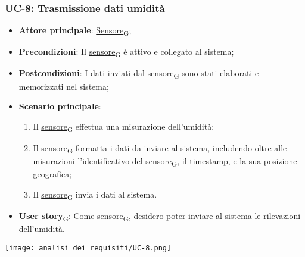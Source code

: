 \subsubsection{UC-8: Trasmissione dati umidità}
\begin{itemize}
	\item \textbf{Attore principale}: \href{https://7last.github.io/docs/rtb/documentazione-interna/glossario\#sensore}{Sensore\textsubscript{G}};
	\item \textbf{Precondizioni}: Il \href{https://7last.github.io/docs/rtb/documentazione-interna/glossario\#sensore}{sensore\textsubscript{G}} è attivo e collegato al sistema;
	\item \textbf{Postcondizioni}: I dati inviati dal \href{https://7last.github.io/docs/rtb/documentazione-interna/glossario\#sensore}{sensore\textsubscript{G}} sono stati elaborati e memorizzati nel sistema;
	\item \textbf{Scenario principale}:
	      \begin{enumerate}
		      \item Il \href{https://7last.github.io/docs/rtb/documentazione-interna/glossario\#sensore}{sensore\textsubscript{G}} effettua una misurazione dell'umidità;
		      \item Il \href{https://7last.github.io/docs/rtb/documentazione-interna/glossario\#sensore}{sensore\textsubscript{G}} formatta i dati da inviare al sistema, includendo oltre alle misurazioni l'identificativo del \href{https://7last.github.io/docs/rtb/documentazione-interna/glossario\#sensore}{sensore\textsubscript{G}},
		            il timestamp, e la sua posizione geografica;
		      \item Il \href{https://7last.github.io/docs/rtb/documentazione-interna/glossario\#sensore}{sensore\textsubscript{G}} invia i dati al sistema.
	      \end{enumerate}
	\item \href{https://7last.github.io/docs/rtb/documentazione-interna/glossario\#user-story}{\textbf{User story}\textsubscript{G}}: Come \href{https://7last.github.io/docs/rtb/documentazione-interna/glossario\#sensore}{sensore\textsubscript{G}}, desidero poter inviare al sistema le rilevazioni dell'umidità.
\end{itemize}

\begin{center}
	\texttt{[image: analisi\_dei\_requisiti/UC-8.png]}
\end{center}

